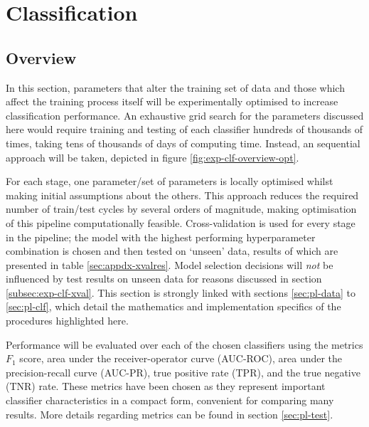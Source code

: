 \section{Classification}
\label{sec:exp-clf}
    \subsection{Overview}
    \label{subsec:exp-clf-overview}
        
        In this section, parameters that alter the training set of data and those which affect the training process itself will be experimentally optimised to increase classification performance. An exhaustive grid search for the parameters discussed here would require training and testing of each classifier hundreds of thousands of times, taking tens of thousands of days of computing time. Instead, an sequential approach will be taken, depicted in figure \ref{fig:exp-clf-overview-opt}. 
    
        For each stage, one parameter/set of parameters is locally optimised whilst making initial assumptions about the others. This approach reduces the required number of train/test cycles by several orders of magnitude, making optimisation of this pipeline computationally feasible. Cross-validation is used for every stage in the pipeline; the model with the highest performing hyperparameter combination is chosen and then tested on `unseen' data, results of which are presented in table \ref{sec:appdx-xvalres}. Model selection decisions will \textit{not} be influenced by test results on unseen data for reasons discussed in section \ref{subsec:exp-clf-xval}. This section is strongly linked with sections \ref{sec:pl-data} to \ref{sec:pl-clf}, which detail the mathematics and implementation specifics of the procedures highlighted here.
        
        Performance will be evaluated over each of the chosen classifiers using the metrics $F_{1}$ score, area under the receiver-operator curve (AUC-ROC), area under the precision-recall curve (AUC-PR), true positive rate (TPR), and the true negative (TNR) rate. These metrics have been chosen as they represent important classifier characteristics in a compact form, convenient for comparing many results. More details regarding metrics can be found in section \ref{sec:pl-test}. 

      
